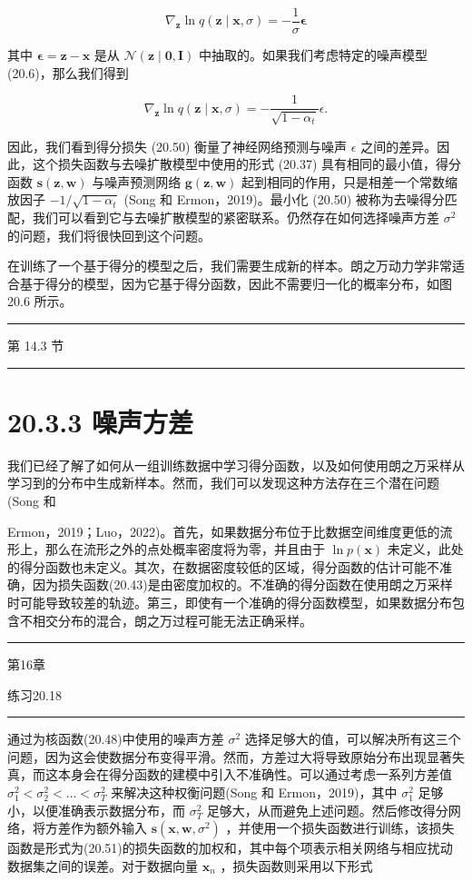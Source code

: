 \documentclass[10pt]{report}
\newcommand{\HRule}{\begin{center}\rule{0.9\linewidth}{0.2mm}\end{center}}
\begin{document}
\[
{\nabla }_{\mathbf{z}}\ln q\left( {\mathbf{z} \mid  \mathbf{x},\sigma }\right)  =  - \frac{1}{\sigma }\mathbf{\epsilon } \tag{20.52}
\]

其中 \(\mathbf{\epsilon } = \mathbf{z} - \mathbf{x}\) 是从 \(\mathcal{N}\left( {\mathbf{z} \mid  \mathbf{0},\mathbf{I}}\right)\) 中抽取的。如果我们考虑特定的噪声模型 (20.6)，那么我们得到

\[
{\nabla }_{\mathbf{z}}\ln q\left( {\mathbf{z} \mid  \mathbf{x},\sigma }\right)  =  - \frac{1}{\sqrt{1 - {\alpha }_{t}}}\epsilon . \tag{20.53}
\]

因此，我们看到得分损失 (20.50) 衡量了神经网络预测与噪声 \(\epsilon\) 之间的差异。因此，这个损失函数与去噪扩散模型中使用的形式 (20.37) 具有相同的最小值，得分函数 \(\mathbf{s}\left( {\mathbf{z},\mathbf{w}}\right)\) 与噪声预测网络 \(\mathbf{g}\left( {\mathbf{z},\mathbf{w}}\right)\) 起到相同的作用，只是相差一个常数缩放因子 \(- 1/\sqrt{1 - {\alpha }_{t}}\) (Song 和 Ermon，2019)。最小化 (20.50) 被称为去噪得分匹配，我们可以看到它与去噪扩散模型的紧密联系。仍然存在如何选择噪声方差 \({\sigma }^{2}\) 的问题，我们将很快回到这个问题。

在训练了一个基于得分的模型之后，我们需要生成新的样本。朗之万动力学非常适合基于得分的模型，因为它基于得分函数，因此不需要归一化的概率分布，如图 20.6 所示。

\HRule

第 14.3 节

\HRule

\section*{20.3.3 噪声方差}

我们已经了解了如何从一组训练数据中学习得分函数，以及如何使用朗之万采样从学习到的分布中生成新样本。然而，我们可以发现这种方法存在三个潜在问题(Song 和

Ermon，2019；Luo，2022)。首先，如果数据分布位于比数据空间维度更低的流形上，那么在流形之外的点处概率密度将为零，并且由于 \(\ln p\left( \mathbf{x}\right)\) 未定义，此处的得分函数也未定义。其次，在数据密度较低的区域，得分函数的估计可能不准确，因为损失函数(20.43)是由密度加权的。不准确的得分函数在使用朗之万采样时可能导致较差的轨迹。第三，即使有一个准确的得分函数模型，如果数据分布包含不相交分布的混合，朗之万过程可能无法正确采样。

\HRule

第16章

练习20.18

\HRule

通过为核函数(20.48)中使用的噪声方差 \({\sigma }^{2}\) 选择足够大的值，可以解决所有这三个问题，因为这会使数据分布变得平滑。然而，方差过大将导致原始分布出现显著失真，而这本身会在得分函数的建模中引入不准确性。可以通过考虑一系列方差值 \({\sigma }_{1}^{2} < {\sigma }_{2}^{2} < \ldots  < {\sigma }_{T}^{2}\) 来解决这种权衡问题(Song 和 Ermon，2019)，其中 \({\sigma }_{1}^{2}\) 足够小，以便准确表示数据分布，而 \({\sigma }_{T}^{2}\) 足够大，从而避免上述问题。然后修改得分网络，将方差作为额外输入 \(\mathbf{s}\left( {\mathbf{x},\mathbf{w},{\sigma }^{2}}\right)\) ，并使用一个损失函数进行训练，该损失函数是形式为(20.51)的损失函数的加权和，其中每个项表示相关网络与相应扰动数据集之间的误差。对于数据向量 \({\mathbf{x}}_{n}\) ，损失函数则采用以下形式
\end{document}
